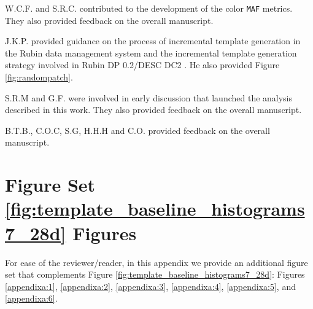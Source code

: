 \documentclass[preprintm,linenumbers]{aastex631}
\begin{document}
W.C.F. and S.R.C. contributed to the development of the color \texttt{MAF} metrics. They also provided feedback on the overall manuscript. 

J.K.P. provided guidance on the process of incremental template generation in the Rubin data management system and the incremental template generation strategy involved in Rubin DP 0.2/DESC DC2 . He also provided Figure \ref{fig:randompatch}.

S.R.M and G.F. were involved in early discussion that launched the analysis described in this work. They also provided feedback on the overall manuscript. 

B.T.B., C.O.C, S.G, H.H.H and C.O. provided feedback on the overall manuscript. 






		\appendix
  
		\section{Figure Set \ref{fig:template_baseline_histograms7_28d} Figures}
		
		For ease of the reviewer/reader, in this appendix we provide an additional figure set that complements Figure \ref{fig:template_baseline_histograms7_28d}: Figures \ref{appendixa:1}, \ref{appendixa:2}, \ref{appendixa:3}, \ref{appendixa:4}, \ref{appendixa:5}, and \ref{appendixa:6}. 
  
\end{document}
